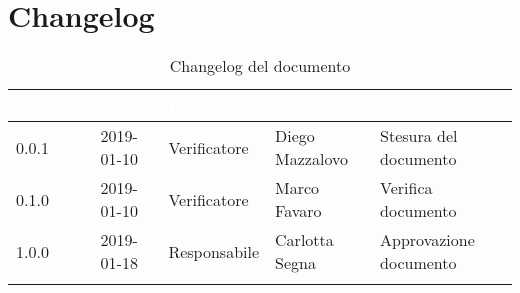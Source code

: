 \newpage

\section{Changelog}

\begin{center}
\begin{longtable}[c]{|m{}|m{}|m{}|m{}|p{}|}
\hline
\rowcolor{bluelogo}\textbf{\textcolor{white}{Versione}} & \textbf{\textcolor{white}{Data}} & \textbf{\textcolor{white}{Ruolo}} & \textbf{\textcolor{white}{Autore}} & \textbf{\textcolor{white}{Descrizione}}\\
\hline 
\endfirsthead
0.0.1 & 2019-01-10 & Verificatore & Diego Mazzalovo & Stesura del documento \\
\hline
\rowcolor{grigio}0.1.0 & 2019-01-10 & Verificatore & Marco Favaro & Verifica documento\\
\hline
1.0.0 & 2019-01-18 & Responsabile & Carlotta Segna & Approvazione documento \\
\hline
\caption{Changelog del documento}
\end{longtable}
\end{center}

